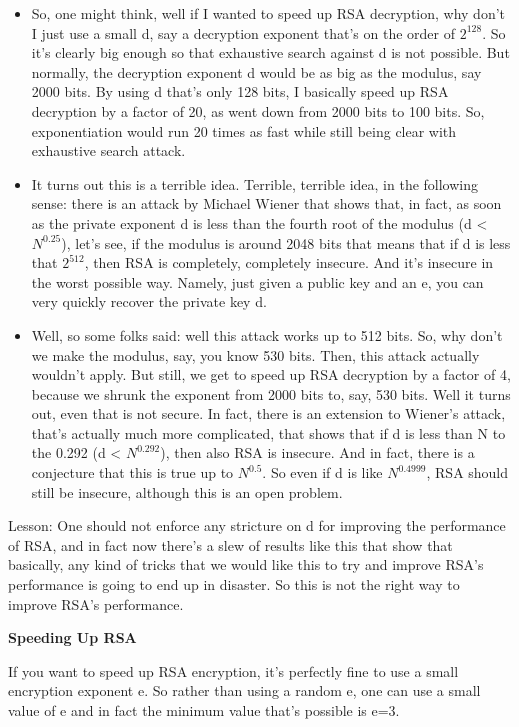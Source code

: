 \documentclass[11pt]{article}
\begin{document}
\begin{itemize}
\item
  So, one might think, well if I wanted to speed up RSA decryption, why
  don't I just use a small d, say a decryption exponent that's on the
  order of \(2^{128}\). So it's clearly big enough so that exhaustive
  search against d is not possible. But normally, the decryption
  exponent d would be as big as the modulus, say 2000 bits. By using d
  that's only 128 bits, I basically speed up RSA decryption by a factor
  of 20, as went down from 2000 bits to 100 bits. So, exponentiation
  would run 20 times as fast while still being clear with exhaustive
  search attack.
\item
  It turns out this is a terrible idea. Terrible, terrible idea, in the
  following sense: there is an attack by Michael Wiener that shows that,
  in fact, as soon as the private exponent d is less than the fourth
  root of the modulus (d \textless{} \(N^{0.25}\)), let's see, if the
  modulus is around 2048 bits that means that if d is less that
  \(2^{512}\), then RSA is completely, completely insecure. And it's
  insecure in the worst possible way. Namely, just given a public key
  and an e, you can very quickly recover the private key d. 
\item
  Well, so some folks said: well this attack works up to 512 bits. So,
  why don't we make the modulus, say, you know 530 bits. Then, this
  attack actually wouldn't apply. But still, we get to speed up RSA
  decryption by a factor of 4, because we shrunk the exponent from 2000
  bits to, say, 530 bits. Well it turns out, even that is not secure. In
  fact, there is an extension to Wiener's attack, that's actually much
  more complicated, that shows that if d is less than N to the 0.292 (d
  \textless{} \(N^{0.292}\)), then also RSA is insecure. And in fact,
  there is a conjecture that this is true up to \(N^{0.5}\). So even if
  d is like \(N^{0.4999}\), RSA should still be insecure, although this
  is an open problem.
\end{itemize}

Lesson: One should not enforce any stricture on d for improving the
performance of RSA, and in fact now there's a slew of results like this
that show that basically, any kind of tricks that we would like this to
try and improve RSA's performance is going to end up in disaster. So
this is not the right way to improve RSA's performance.

\textbf{Speeding Up RSA}

If you want to speed up RSA encryption, it's perfectly fine to use a
small encryption exponent e. So rather than using a random e, one can
use a small value of e and in fact the minimum value that's possible is
e=3.
\end{document}
